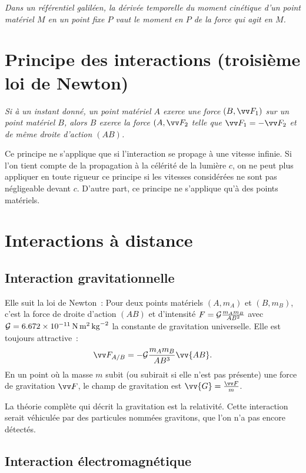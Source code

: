 \emph{Dans un référentiel galiléen, la dérivée temporelle du moment cinétique d'un point matériel $M$ en un point fixe $P$ vaut le moment en $P$ de la force qui agit en $M$.}

\section{Principe des interactions (troisième loi de Newton)}
\label{chap2-sec:principedesinteractions}

\emph{Si à un instant donné, un point matériel $A$ exerce une force $(B,\vF_1)$ sur un point matériel $B$, alors $B$ exerce la force $(A, \vF_2$ telle que $\vF_1 =-\vF_2$ et de même droite d'action $(AB)$.}  

Ce principe ne s'applique que si l'interaction se propage à une vitesse infinie. Si l'on tient compte de la propagation à la célérité de la lumière $c$, on ne peut plus appliquer en toute rigueur ce principe si les vitesses considérées ne sont pas négligeable devant $c$. D'autre part, ce principe ne s'applique qu'à des points matériels.

\section{Interactions à distance}
\label{chap2-sec:interactionsadistance}

\subsection{Interaction gravitationnelle}
\label{chap2-subsec:interactiongravitationnelle}

Elle suit la loi de Newton~: Pour deux points matériels $(A, m_A)$ et $(B, m_B)$, c'est la force de droite d'action $(AB)$ et d'intensité $F=\mathcal{G} \frac{m_A m_B}{AB^2}$ avec $\mathcal{G} = \SI{6,672e-11}{N.m^2.kg^{-2}}$ la constante de gravitation universelle. Elle est toujours attractive~:
\begin{equation}
  \vF_{A/B} = -\Gb \frac{m_A m_B}{AB^3}\vv{AB}.
\end{equation}
En un point où la masse $m$ subit (ou subirait si elle n'est pas présente) une force de gravitation $\vF$, le champ de gravitation est $\vv{G}=\frac{\vF}{m}$.

La théorie complète qui décrit la gravitation est la relativité. Cette interaction serait véhiculée par des particules nommées gravitons, que l'on n'a pas encore détectés.

\subsection{Interaction électromagnétique}
\label{chap2-subsec:interactionelectromagnetique}

